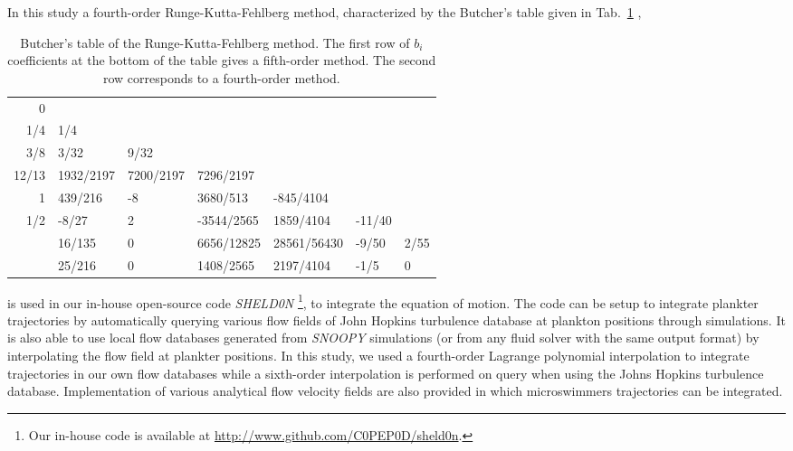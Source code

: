 In this study a fourth-order Runge-Kutta-Fehlberg method, characterized by the Butcher's table given in Tab.~\ref{tab:runge_kutta_fehlberg_table} \citep{fehlberg1968classical},
\begin{table}
	\center
	\begin{tabular}{ r | l l l l l l }
		0 & & & & & & \\
		1/4 & 1/4 & & & & & \\
		3/8 & 3/32 & 9/32 & & & & \\
		12/13 & 1932/2197 & 7200/2197 & 7296/2197 & & & \\
		1 & 439/216 & -8 & 	3680/513 & -845/4104 & & \\
		1/2 & -8/27 & 2 & -3544/2565 & 1859/4104 & -11/40 & \\
		\midrule
		 & 16/135 & 0 & 6656/12825 & 28561/56430 & -9/50 & 2/55 \\
		 & 25/216 & 0 & 1408/2565 & 2197/4104 & -1/5 & 0
	\end{tabular}

	\caption[Butcher's table of the Runge-Kutta-Fehlberg method.]{
		Butcher's table of the Runge-Kutta-Fehlberg method.
		The first row of $b_i$ coefficients at the bottom of the table gives a fifth-order method.
		The second row corresponds to a fourth-order method.
	}
	\label{tab:runge_kutta_fehlberg_table}
\end{table}
is used in our in-house open-source code \textit{SHELD0N} \footnote{Our in-house code is available at \url{http://www.github.com/C0PEP0D/sheld0n}.}, to integrate the equation of motion.
The code can be setup to integrate plankter trajectories by automatically querying various flow fields of John Hopkins turbulence database at plankton positions through simulations.
It is also able to use local flow databases generated from \textit{SNOOPY} simulations (or from any fluid solver with the same output format) by interpolating the flow field at plankter positions.
In this study, we used a fourth-order Lagrange polynomial interpolation to integrate trajectories in our own flow databases while a sixth-order interpolation is performed on query when using the Johns Hopkins turbulence database.
Implementation of various analytical flow velocity fields are also provided in which microswimmers trajectories can be integrated.
